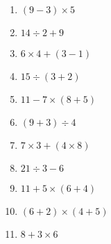 \documentclass{article}
\begin{document}
\begin{enumerate}
\item \quad \( (9 -3) \times 5 \)
\vspace{45pt}
\hline
\vspace{5pt}

\item \quad \( 14 \div 2 + 9 \)
\vspace{45pt}
\hline
\vspace{5pt}

\item \quad \( 6 \times 4 + (3 - 1) \)
\vspace{45pt}
\hline
\vspace{5pt}

\item \quad \( 15 \div (3 + 2) \)
\vspace{45pt}
\hline
\vspace{5pt}

\item \quad \( 11 - 7 \times (8 + 5) \)
\vspace{45pt}
\hline
\vspace{5pt}

\item \quad \( (9 + 3) \div 4 \)
\vspace{45pt}
\hline
\vspace{5pt}

\item \quad \( 7 \times 3 + (4 \times 8) \)
\vspace{45pt}
\hline
\vspace{5pt}

\item \quad \( 21 \div 3 - 6 \)
\vspace{45pt}
\hline
\vspace{5pt}

\item \quad \( 11 + 5 \times (6 + 4) \)
\vspace{45pt}
\hline
\vspace{5pt}

\item \quad \( (6 + 2) \times (4 + 5) \)
\vspace{45pt} 
\vspace{5pt}

\item \quad \( 8 + 3 \times 6 \)
\vspace{45pt} 
\hline
\vspace{5pt}


\end{enumerate}
\end{document}
